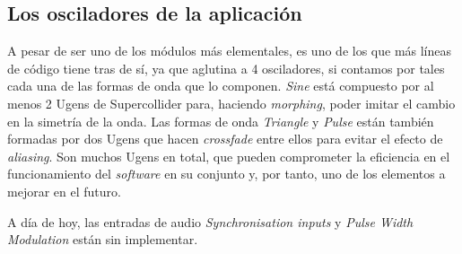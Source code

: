 \subsection{Los osciladores de la aplicación \textit{\className}}
A pesar de ser uno de los módulos más elementales, es uno de los que más líneas de código tiene tras de sí, ya que aglutina a 4 osciladores, si contamos por tales cada una de las formas de onda que lo componen. \textit{Sine} está compuesto por al menos 2 Ugens de Supercollider para, haciendo \textit{morphing}, poder imitar el cambio en la simetría de la onda. Las formas de onda \textit{Triangle} y \textit{Pulse} están también formadas por dos Ugens que hacen \textit{crossfade} entre ellos para evitar el efecto de \textit{aliasing}. Son muchos Ugens en total, que pueden comprometer la eficiencia en el funcionamiento del \textit{software} en su conjunto y, por tanto, uno de los elementos a mejorar en el futuro.

A día de hoy, las entradas de audio \textit{Synchronisation inputs} y \textit{Pulse Width Modulation} están sin implementar.
